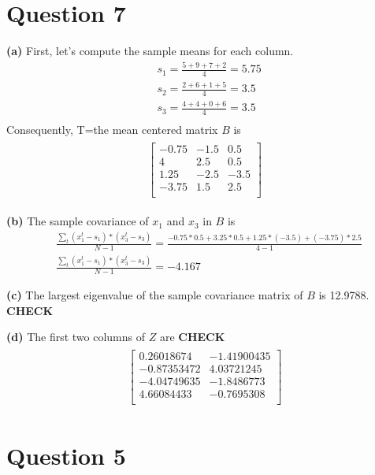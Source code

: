 \documentclass[leqno]{article}
\begin{document}
\section*{Question 7} \textbf{(a)} First, let's compute the sample means for each column.
\begin{equation*}
\begin{split}
&s_1 = \frac{5 + 9 + 7 + 2}{4} = 5.75 \\
&s_2 = \frac{2+6+1+5}{4} = 3.5\\
&s_3 = \frac{4+4+0+6}{4} = 3.5\\
\end{split}
\end{equation*}
Consequently, T=the mean centered matrix $B$ is
\begin{gather*}
\begin{split}
\begin{bmatrix} 
   -0.75 & -1.5 & 0.5\\
   4 & 2.5 & 0.5\\
   1.25 & -2.5 & -3.5\\
   -3.75 & 1.5 & 2.5\\
\end{bmatrix}
\end{split}
\end{gather*}

\noindent \textbf{(b)} The sample covariance of $x_1$ and $x_3$ in $B$ is
\begin{equation*}
\begin{split}
&\frac{\sum_t(x_1^t - s_1)*(x_3^t - s_3)}{N - 1} = \frac{-0.75*0.5 + 3.25*0.5 + 1.25*(-3.5) + (-3.75)*2.5}{4 - 1}\\
&\frac{\sum_t(x_1^t - s_1)*(x_3^t - s_3)}{N - 1} = -4.167
\end{split}
\end{equation*}

\noindent \textbf{(c)} The largest eigenvalue of the sample covariance matrix of $B$ is 12.9788. \textbf{CHECK}

\noindent \textbf{(d)} The first two columns of $Z$ are \textbf{CHECK}
\begin{gather*}
\begin{split}
\begin{bmatrix} 
   0.26018674 & -1.41900435\\
   -0.87353472 & 4.03721245\\
   -4.04749635 & -1.8486773\\
   4.66084433 & -0.7695308\\
\end{bmatrix}
\end{split}
\end{gather*}

\hfill
\section*{Question 5}

\hfill
   
\end{document}
